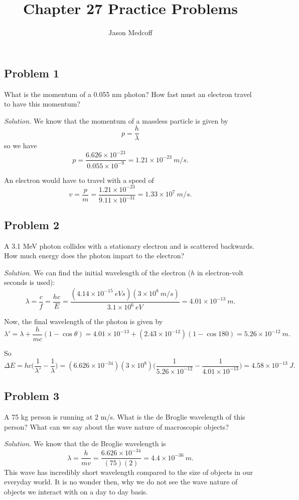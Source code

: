 \documentclass{article}
\title{Chapter 27 Practice Problems}
\author{Jason Medcoff}
\date{}
\begin{document}
	\maketitle
	
	\subsection{Problem 1} What is the momentum of a 0.055 nm photon? How fast must an electron travel to have this momentum?
	
	\textit{Solution.}
	We know that the momentum of a massless particle is given by
	$$ p = \frac{h}{\lambda} $$
	so we have 
	$$ p = \frac{6.626\times 10^{-23}}{0.055 \times 10^{-9}} = 1.21 \times 10^{-23} \ m/s.$$
	
	An electron would have to travel with a speed of
	$$v = \frac{p}{m} = \frac{1.21 \times 10^{-23} }{9.11\times 10^{-31}} = 1.33 \times 10^{7} \ m/s. $$
	
	\subsection{Problem 2}
	A 3.1 MeV photon collides with a stationary electron and is scattered backwards. How much energy does the photon impart to the electron?
	
	\textit{Solution.}
	We can find the initial wavelength of the electron ($h$ in electron-volt seconds is used):
	$$ \lambda = \frac{c}{f} = \frac{hc}{E} = \frac{(4.14 \times 10^{-15} \ eVs)(3 \times 10^8 \ m/s)}{3.1 \times 10^6 \ eV} = 4.01 \times 10^{-13} \ m . $$
	
	Now, the final wavelength of the photon is given by
	$$ \lambda' = \lambda + \frac{h}{mc} (1-\cos\theta) = 4.01 \times 10^{-13} + (2.43 \times 10^{-12})(1-\cos180) = 5.26 \times 10^{-12} \ m.$$
	
	So
	$$ \Delta E = hc \bigg( \frac{1}{\lambda'} - \frac{1}{\lambda} \bigg) = (6.626 \times 10^{-34})(3 \times 10^8) \bigg( \frac{1}{5.26 \times 10^{-12}} - \frac{1}{4.01 \times 10^{-13}} \bigg) = 4.58 \times 10^{-13} \ J .$$
	
	
	\subsection{Problem 3}
	A 75 kg person is running at 2 m/s. What is the de Broglie wavelength of this person? What can we say about the wave nature of macroscopic objects?
	
	\textit{Solution.}
	We know that the de Broglie wavelength is
	$$ \lambda = \frac{h}{mv} = \frac{6.626 \times 10^{-34}}{(75)(2)} = 4.4 \times 10^{-36} \ m.$$
	This wave has incredibly short wavelength compared to the size of objects in our everyday world. It is no wonder then, why we do not see the wave nature of objects we interact with on a day to day basis.
	
	
	
	
	
	
	
	
	
\end{document}
